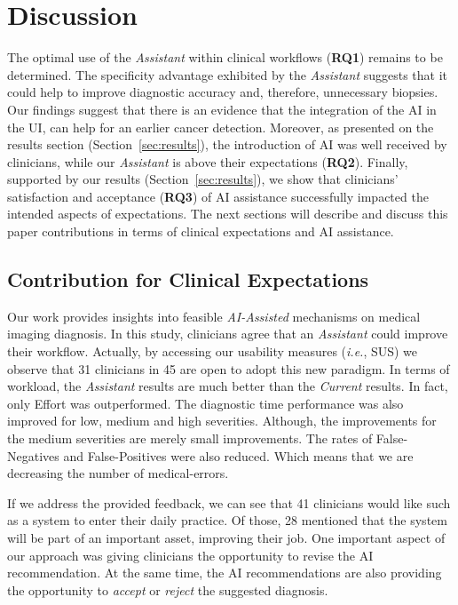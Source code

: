 \section{Discussion}
\label{sec:discussion}

The optimal use of the {\it Assistant} within clinical workflows ({\bf RQ1}) remains to be determined.
The specificity advantage exhibited by the {\it Assistant} suggests that it could help to improve diagnostic accuracy and, therefore, unnecessary biopsies.
Our findings suggest that there is an evidence that the integration of the AI in the UI, can help for an earlier cancer detection. 
Moreover, as presented on the results section (Section~\ref{sec:results}), the introduction of AI was well received by clinicians, while our {\it Assistant} is above their expectations ({\bf RQ2}).
Finally, supported by our results (Section~\ref{sec:results}), we show that clinicians' satisfaction and acceptance ({\bf RQ3}) of AI assistance successfully impacted the intended aspects of expectations.
The next sections will describe and discuss this paper contributions in terms of clinical expectations and AI assistance.

\subsection{Contribution for Clinical Expectations}

Our work provides insights into feasible {\it AI-Assisted} mechanisms on medical imaging diagnosis.
In this study, clinicians agree that an {\it Assistant} could improve their workflow.
Actually, by accessing our usability measures ({\it i.e.}, SUS) we observe that 31 clinicians in 45 are open to adopt this new paradigm.
In terms of workload, the {\it Assistant} results are much better than the {\it Current} results.
In fact, only Effort was outperformed.
The diagnostic time performance was also improved for low, medium and high severities.
Although, the improvements for the medium severities are merely small improvements.
The rates of False-Negatives and False-Positives were also reduced.
Which means that we are decreasing the number of medical-errors.

If we address the provided feedback, we can see that 41 clinicians would like such as a system to enter their daily practice. Of those, 28 mentioned that the system will be part of an important asset, improving their job.
One important aspect of our approach was giving clinicians the opportunity to revise the AI recommendation.
At the same time, the AI recommendations are also providing the opportunity to {\it accept} or {\it reject} the suggested diagnosis.


